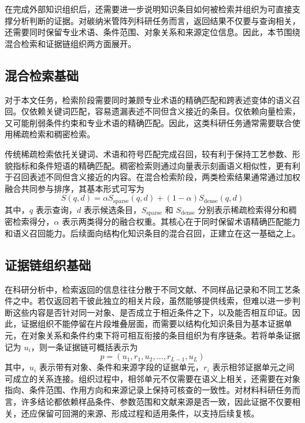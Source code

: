 在完成外部知识组织后，还需要进一步说明知识条目如何被检索并组织为可直接支撑分析判断的证据。对碳纳米管阵列科研任务而言，返回结果不仅要与查询相关，还需要同时保留专业术语、条件范围、对象关系和来源定位信息。因此，本节围绕混合检索和证据链组织两方面展开。

\subsection{混合检索基础}

对于本文任务，检索阶段需要同时兼顾专业术语的精确匹配和跨表述变体的语义召回。仅依赖关键词匹配，容易遗漏表述不同但含义接近的条目。仅依赖向量检索，又可能削弱条件约束和专业术语的精确匹配\cite{Mostafa2024}。因此，这类科研任务通常需要联合使用稀疏检索和稠密检索。

传统稀疏检索依托关键词、术语和符号匹配完成召回，较有利于保持工艺参数、形貌指标和条件短语的精确匹配\cite{Robertson2009BM25}。稠密检索则通过向量表示刻画语义相似性，更有利于召回表述不同但含义接近的内容\cite{Reimers2019SentenceBERT}。在混合检索阶段，两类检索结果通常通过加权融合共同参与排序，其基本形式可写为
\begin{equation}
    S(q,d)=\alpha S_{\mathrm{sparse}}(q,d)+(1-\alpha)S_{\mathrm{dense}}(q,d)
\end{equation}
其中，$q$ 表示查询，$d$ 表示候选条目，$S_{\mathrm{sparse}}$ 和 $S_{\mathrm{dense}}$ 分别表示稀疏检索得分和稠密检索得分，$\alpha$ 表示两类得分的融合权重。其核心在于同时保留术语精确匹配能力和语义召回能力。后续面向结构化知识条目的混合召回，正建立在这一基础之上。

\subsection{证据链组织基础}

在科研分析中，检索返回的信息往往分散于不同文献、不同样品记录和不同工艺条件之中。若仅返回若干彼此独立的相关片段，虽然能够提供线索，但难以进一步判断这些内容是否针对同一对象、是否成立于相近条件之下，以及能否相互印证。因此，证据组织不能停留在片段堆叠层面，而需要以结构化知识条目为基本证据单元，在对象关系和条件约束下将可相互衔接的条目组织为有序链条。若将单条证据记为 $u_i$，则一条证据链可概括表示为
\begin{equation}
    p=(u_1,r_1,u_2,\ldots,r_{L-1},u_L)
\end{equation}
其中，$u_i$ 表示带有对象、条件和来源字段的证据单元，$r_i$ 表示相邻证据单元之间可成立的关系连接。组织过程中，相邻单元不仅需要在语义上相关，还需要在对象指向、条件范围、作用方向和来源记录上保持可核查的一致性。对材料科研任务而言，许多结论都依赖样品条件、参数范围和文献来源是否一致，因此证据不仅要相关，还应保留可回溯的来源、形成过程和适用条件，以支持后续复核\cite{Soudani2024}。

